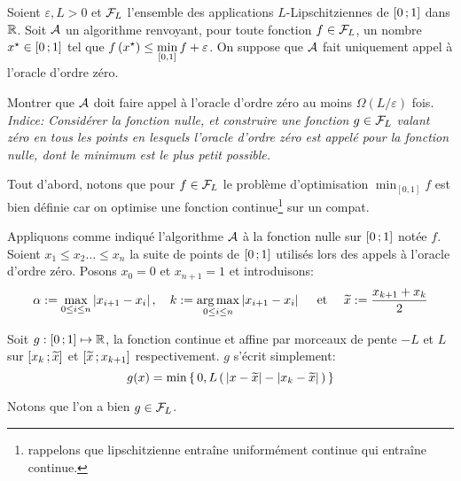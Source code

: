 \begin{chap}



\begin{exo}
Soient $\varepsilon, L>0$ et $\mathcal { F } _ { L }$ l'ensemble des applications $L$-Lipschitziennes de $\mathopen{[}0\mathpunct{};1\mathclose{]}$
 dans $\mathbb{R}$. Soit $\mathcal{A}$ un algorithme renvoyant, pour toute fonction $ f \in \mathcal { F } _ { L }$,
  un nombre $\xopt \in \intff{0}{1}$ tel que $\displaystyle f \left( \xopt \right) \leq \min _ { [ 0,1 ] } f + \varepsilon$. On suppose que $\mathcal{A}$ fait uniquement appel à l’oracle d’ordre zéro.
\end{exo}

\begin{qst}
Montrer que $\mathcal{A}$ doit faire appel à l’oracle d’ordre zéro au moins $\Omega ( L / \varepsilon )$ fois. \textit{Indice: Considérer la fonction nulle, et construire une fonction $g \in \mathcal { F } _ { L }$ valant zéro en tous les points en lesquels l’oracle d’ordre zéro est appelé pour la fonction nulle, dont le minimum est le plus petit possible.}
\end{qst}

\begin{rep}

Tout d'abord, notons que pour $ f \in \mathcal { F } _ { L }$ le problème d'optimisation $ \displaystyle \min _ { [ 0,1 ] } f$ est bien définie car on optimise une fonction continue\footnote{rappelons que lipschitzienne entraîne uniformément continue qui entraîne continue.} sur un compat.

Appliquons comme indiqué l'algorithme $\mathcal{A}$ à la fonction nulle sur $\mathopen{[}0\mathpunct{};1\mathclose{]}$ notée $f$. Soient $x_1 \leq x_2 \ldots \leq x_n$ la suite de points de $\mathopen{[}0\mathpunct{};1\mathclose{]}$ utilisés lors des appels à l'oracle d'ordre zéro. Posons $x_0 = 0$ et $x_{n+1}=1$ et introduisons:
  $$\alpha := \max_{0\leq i \leq n} \abs{x_{i+1}-x_{i}}
  , \quad  k := \argmax_{0\leq i \leq n} \abs{x_{i+1}-x_{i}}
  \quad \text{ et } \quad \xtilde := \frac{x_{k+1}+x_{k}}{2}
  $$

  Soit $g:\mathopen{[}0\mathpunct{};1\mathclose{]} \mapsto \mathbb{R}$, la fonction continue et affine par morceaux de pente
  $-L$ et $L$ sur $\mathopen{[}x_k\mathpunct{};\widetilde{x}\mathclose{]}$ et $\mathopen{[}\widetilde{x}\mathpunct{};x_{k+1}\mathclose{]}$ respectivement. $g$
  s'écrit simplement:
  $$g(x)= \min \acc{ 0,L\prt{\abs{x-\xtilde} - \abs{x_k-\xtilde}} }$$

Notons que l'on a bien $g\in \mathcal { F } _ { L }$.


\end{rep}
\end{chap}

